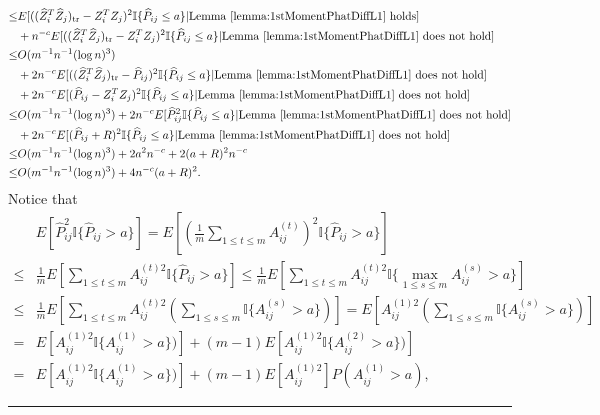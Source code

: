 \documentclass[a4paper]{article}
\newenvironment{proof}{{\bf Proof:  }}{\hfill\rule{2mm}{2mm}}
\renewcommand{\hat}{\widehat}
\begin{document}
\begin{proof}
\begin{align*}
	\le & E[((\hat{Z}_i^T \hat{Z}_j)_{\mathrm{tr}} - Z_i^T Z_j)^2 \mathbb{I}\{\hat{P}_{ij} \le a\} | \mathrm{Lemma\ } \ref{lemma:1stMomentPhatDiffL1} \mathrm{\ holds}] \\
	& + n^{-c} E[((\hat{Z}_i^T \hat{Z}_j)_{\mathrm{tr}} - Z_i^T Z_j)^2 \mathbb{I}\{\hat{P}_{ij} \le a\} | \mathrm{Lemma\ } \ref{lemma:1stMomentPhatDiffL1} \mathrm{\ does\ not\ hold}] \\
	\le & O(m^{-1} n^{-1} (\log n)^3) \\
	& + 2 n^{-c} E[((\hat{Z}_i^T \hat{Z}_j)_{\mathrm{tr}} - \hat{P}_{ij})^2 \mathbb{I}\{\hat{P}_{ij} \le a\}| \mathrm{Lemma\ } \ref{lemma:1stMomentPhatDiffL1} \mathrm{\ does\ not\ hold}] \\
	& + 2 n^{-c} E[(\hat{P}_{ij} - Z_i^T Z_j)^2 \mathbb{I}\{\hat{P}_{ij} \le a\}| \mathrm{Lemma\ } \ref{lemma:1stMomentPhatDiffL1} \mathrm{\ does\ not\ hold}] \\
	\le & O(m^{-1} n^{-1} (\log n)^3) + 2 n^{-c} E[\hat{P}_{ij}^2 \mathbb{I}\{\hat{P}_{ij} \le a\}| \mathrm{Lemma\ } \ref{lemma:1stMomentPhatDiffL1} \mathrm{\ does\ not\ hold}] \\
	& + 2 n^{-c} E[(\hat{P}_{ij} + R)^2 \mathbb{I}\{\hat{P}_{ij} \le a\}| \mathrm{Lemma\ } \ref{lemma:1stMomentPhatDiffL1} \mathrm{\ does\ not\ hold}] \\
	\le & O(m^{-1} n^{-1} (\log n)^3) + 2 a^2 n^{-c} + 2 (a+R)^2 n^{-c} \\
	\le & O(m^{-1} n^{-1} (\log n)^3) + 4 n^{-c} (a + R)^2.
\end{align*}
Notice that
\begin{align*}
	& E[\hat{P}_{ij}^2 \mathbb{I} \{ \hat{P}_{ij} > a \}]
	= E[(\frac{1}{m} \sum_{1 \le t \le m} A_{ij}^{(t)})^2 \mathbb{I} \{ \hat{P}_{ij} > a \}] \\
	\le & \frac{1}{m} E[\sum_{1 \le t \le m} A_{ij}^{(t)2} \mathbb{I} \{ \hat{P}_{ij} > a \}]
	\le \frac{1}{m} E[\sum_{1 \le t \le m} A_{ij}^{(t)2} \mathbb{I} \{ \max_{1 \le s \le m} A_{ij}^{(s)} > a \}] \\
	\le & \frac{1}{m} E[\sum_{1 \le t \le m} A_{ij}^{(t)2} (\sum_{1 \le s \le m}\mathbb{I} \{ A_{ij}^{(s)} > a \})]
	= E[A_{ij}^{(1)2} (\sum_{1 \le s \le m}\mathbb{I} \{ A_{ij}^{(s)} > a \})] \\
	= & E[A_{ij}^{(1)2} \mathbb{I} \{ A_{ij}^{(1)} > a \})] + (m-1) E[A_{ij}^{(1)2} \mathbb{I} \{ A_{ij}^{(2)} > a \})] \\
	= & E[A_{ij}^{(1)2} \mathbb{I} \{ A_{ij}^{(1)} > a \})] + (m-1) E[A_{ij}^{(1)2}] P(A_{ij}^{(1)} > a),
\end{align*}

\end{proof}
\end{document}
